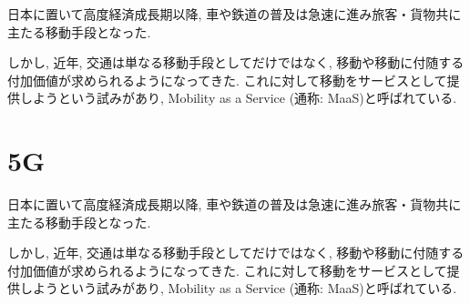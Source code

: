 日本に置いて高度経済成長期以降, 車や鉄道の普及は急速に進み旅客・貨物共に主たる移動手段となった.

しかし, 近年, 交通は単なる移動手段としてだけではなく, 移動や移動に付随する付加価値が求められるようになってきた.
これに対して移動をサービスとして提供しようという試みがあり, Mobility as a Service (通称: MaaS)と呼ばれている.


\section{5G}

日本に置いて高度経済成長期以降, 車や鉄道の普及は急速に進み旅客・貨物共に主たる移動手段となった.

しかし, 近年, 交通は単なる移動手段としてだけではなく, 移動や移動に付随する付加価値が求められるようになってきた.
これに対して移動をサービスとして提供しようという試みがあり, Mobility as a Service (通称: MaaS)と呼ばれている.




